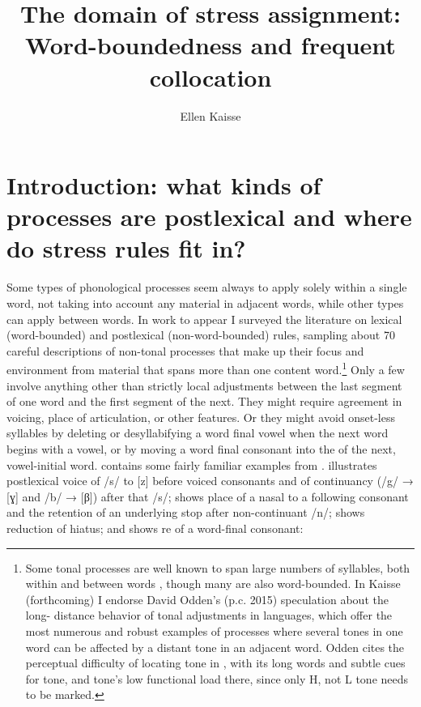 \documentclass[output=paper,
modfonts
]{LSP/langsci}
\title{The domain of stress assignment: Word-boundedness and frequent collocation}
\author{%
Ellen Kaisse\affiliation{University of Washington}
}
\begin{document}
\maketitle

\section{Introduction: what kinds of processes are postlexical and where do stress rules fit in?}
Some types of phonological processes seem always to apply solely within a single word, not taking into account any material in adjacent words, while other types can apply between words. In work to appear \citep{kaisseforthcoming} I surveyed the literature on lexical (word-bounded) and postlexical (non-word-bounded) rules, sampling about 70 careful descriptions of non-tonal processes that make up their focus and environment from material that spans more than one content word.\footnote{Some tonal processes are well known to span large numbers of syllables, both within and between words \citep{hyman2011}, though many are also word-bounded. In Kaisse (forthcoming) I endorse David Odden’s (p.c. 2015) speculation about the long- distance behavior of tonal adjustments in  languages, which offer the most numerous and robust examples of processes where several tones in one word can be affected by a distant tone in an adjacent word. Odden cites the perceptual difficulty of locating tone in , with its long words and subtle cues for tone, and tone’s low functional load there, since only H, not L tone needs to be marked.} Only a few involve anything other than strictly local adjustments between the last segment of one word and the first segment of the next. They might require agreement in voicing, place of articulation, or other features. Or they might avoid onset-less syllables by deleting or desyllabifying a word final vowel when the next word begins with a vowel, or by moving a word final consonant into the  of the next, vowel-initial word.  contains some fairly familiar examples from .  illustrates postlexical voice  of /s/ to [z] before voiced consonants and  of continuancy (/g/ → [ɣ] and /b/ → [β]) after that /s/;  shows place  of a nasal to a following consonant and the retention of an underlying stop after non-continuant /n/;  shows reduction of hiatus; and  shows re of a word-final consonant:
\end{document}
